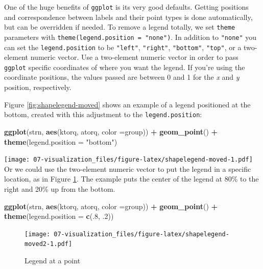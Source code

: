 \documentclass[
]{book}
\newenvironment{Shaded}{\begin{snugshade}}{\end{snugshade}}
\newcommand{\DataTypeTok}[1]{\textcolor[rgb]{0.13,0.29,0.53}{#1}}
\newcommand{\DecValTok}[1]{\textcolor[rgb]{0.00,0.00,0.81}{#1}}
\newcommand{\FloatTok}[1]{\textcolor[rgb]{0.00,0.00,0.81}{#1}}
\newcommand{\KeywordTok}[1]{\textcolor[rgb]{0.13,0.29,0.53}{\textbf{#1}}}
\newcommand{\NormalTok}[1]{#1}
\newcommand{\OperatorTok}[1]{\textcolor[rgb]{0.81,0.36,0.00}{\textbf{#1}}}
\newcommand{\StringTok}[1]{\textcolor[rgb]{0.31,0.60,0.02}{#1}}
\begin{document}
One of the huge benefits of \texttt{ggplot} is its very good defaults. Getting positions and correspondence between labels and their point types is done automatically, but can be overridden if needed. To remove a legend totally, we set \texttt{theme} parameters with \texttt{theme(legend.position\ =\ "none")}. In addition to \texttt{"none"} you can set the \texttt{legend.position} to be \texttt{"left"}, \texttt{"right"}, \texttt{"bottom"}, \texttt{"top"}, or a two-element numeric vector. Use a two-element numeric vector in order to pass \texttt{ggplot} specific coordinates of where you want the legend. If you're using the coordinate positions, the values passed are between 0 and 1 for the \emph{x} and \emph{y} position, respectively.

Figure \ref{fig:shapelegend-moved} shows an example of a legend positioned at the bottom, created with this adjustment to the \texttt{legend.position}:

\begin{Shaded}
\begin{Highlighting}[]
\KeywordTok{ggplot}\NormalTok{(strn, }\KeywordTok{aes}\NormalTok{(ktorq, atorq, }\DataTypeTok{color =}\NormalTok{group)) }\OperatorTok{+}
\StringTok{  }\KeywordTok{geom_point}\NormalTok{() }\OperatorTok{+}\StringTok{ }
\StringTok{  }\KeywordTok{theme}\NormalTok{(}\DataTypeTok{legend.position =} \StringTok{"bottom"}\NormalTok{)}
\end{Highlighting}
\end{Shaded}

\texttt{[image: 07-visualization\_files/figure-latex/shapelegend-moved-1.pdf]}
Or we could use the two-element numeric vector to put the legend in a specific location, as in Figure \ref{fig:shapelegend-moved2}. The example puts the center of the legend at 80\% to the right and 20\% up from the bottom.

\begin{Shaded}
\begin{Highlighting}[]
\KeywordTok{ggplot}\NormalTok{(strn, }\KeywordTok{aes}\NormalTok{(ktorq, atorq, }\DataTypeTok{color =}\NormalTok{group)) }\OperatorTok{+}
\StringTok{  }\KeywordTok{geom_point}\NormalTok{() }\OperatorTok{+}\StringTok{ }
\StringTok{  }\KeywordTok{theme}\NormalTok{(}\DataTypeTok{legend.position =} \KeywordTok{c}\NormalTok{(.}\DecValTok{8}\NormalTok{, }\FloatTok{.2}\NormalTok{))}
\end{Highlighting}
\end{Shaded}

\begin{figure}
\centering
\texttt{[image: 07-visualization\_files/figure-latex/shapelegend-moved2-1.pdf]}
\caption{\label{fig:shapelegend-moved2}Legend at a point}
\end{figure}
\end{document}
